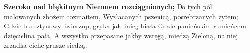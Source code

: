 \underline{\textbf{Szeroko nad błękitnym Niemnem rozciągnionych;}}
Do tych pól malowanych zbożem rozmaitem,
Wyzłacanych pszenicą, posrebrzanych żytem;
Gdzie bursztynowy świerzop, gryka jak śnieg biała
Gdzie panieńskim rumieńcem dzięcielina pała,
A wszystko przepasane jakby wstęgą, miedzą
Zieloną, na niej zrzadka ciche grusze siedzą.
